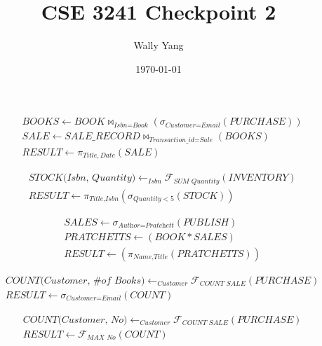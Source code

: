 \documentclass[12pt, letterpaper]{article}
\title{CSE 3241 Checkpoint 2}
\author{Wally Yang}
\date{\today}
\begin{document}
\maketitle

\begin{align*}
  &\textit{BOOKS} \leftarrow \textit{BOOK} \bowtie_{\textit{Isbn} = \textit{Book}} (\sigma_{\textit{Customer}=\textit{Email}}(\textit{PURCHASE}))\\
  &\textit{SALE} \leftarrow \textit{SALE\_RECORD} \bowtie_{\textit{Transaction\_id} = \textit{Sale}} (\textit{BOOKS})\\
  &\textit{RESULT} \leftarrow \pi_{Title, Date} (\textit{SALE})
\end{align*}

\begin{align*}
  &\textit{STOCK(Isbn, Quantity)} \leftarrow _{\textit{Isbn}}\mathcal{F}_{\textit{SUM Quantity}}(\textit{INVENTORY})\\
  &\textit{RESULT} \leftarrow \pi_{\textit{Title}, \textit{Isbn}}(\sigma_{\textit{Quantity} < 5}(STOCK))
\end{align*}

\begin{align*}
  &\textit{SALES} \leftarrow \sigma_{\textit{Author} = \textit{Pratchett}}(\textit{PUBLISH})\\
  &\textit{PRATCHETTS} \leftarrow (\textit{BOOK} * \textit{SALES})\\
  &\textit{RESULT} \leftarrow (\pi_{\textit{Name}, \textit{Title}}(PRATCHETTS))
\end{align*}

\begin{align*}
  &\textit{COUNT(Customer, \# of Books)} \leftarrow _{\textit{Customer}}\mathcal{F}_{\textit{COUNT SALE}}(\textit{PURCHASE})\\
  &\textit{RESULT} \leftarrow \sigma_{\textit{Customer} = \textit{Email}}(\textit{COUNT})
\end{align*}

\begin{align*}
  &\textit{COUNT(Customer, No)} \leftarrow _{\textit{Customer}}\mathcal{F}_{\textit{COUNT SALE}}(\textit{PURCHASE})\\
  &\textit{RESULT} \leftarrow \mathcal{F}_{\textit{MAX No}}(\textit{COUNT})
\end{align*}
\end{document}
